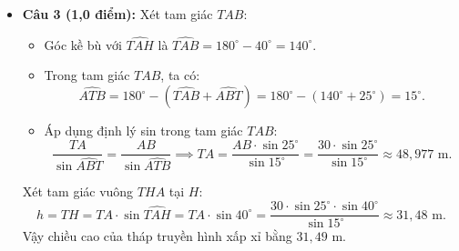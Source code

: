 \documentclass[12pt,a4paper]{article}
\begin{document}
\begin{itemize}[leftmargin=0.6cm, itemsep=4pt]
\item \textbf{Câu 3 (1,0 điểm):}
Xét tam giác $TAB$:
\begin{itemize}
    \item Góc kề bù với $\widehat{TAH}$ là $\widehat{TAB} = 180^\circ - 40^\circ = 140^\circ$.
    \item Trong tam giác $TAB$, ta có:
    \[
    \widehat{ATB} = 180^\circ - (\widehat{TAB} + \widehat{ABT}) = 180^\circ - (140^\circ + 25^\circ) = 15^\circ.
    \]
    \item Áp dụng định lý sin trong tam giác $TAB$:
    \[
    \dfrac{TA}{\sin\widehat{ABT}} = \dfrac{AB}{\sin\widehat{ATB}} \implies TA = \dfrac{AB\cdot\sin 25^\circ}{\sin 15^\circ} = \dfrac{30\cdot\sin 25^\circ}{\sin 15^\circ} \approx 48{,}977\text{ m}.
    \]
\end{itemize}
Xét tam giác vuông $THA$ tại $H$:
\[
h = TH = TA\cdot\sin\widehat{TAH} = TA\cdot\sin 40^\circ = \dfrac{30\cdot\sin 25^\circ\cdot\sin 40^\circ}{\sin 15^\circ} \approx 31{,}48\text{ m}.
\]
Vậy chiều cao của tháp truyền hình xấp xỉ bằng $31{,}49\text{ m}$.


\end{itemize}
\end{document}
